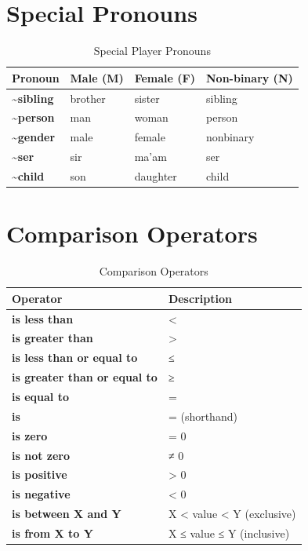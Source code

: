 \documentclass[11pt,letterpaper,oldstylefigures]{memoir}
\newcommand{\fountain}[1]{\textbf{#1}}
\begin{document}
\section{Special Pronouns}
\begin{table}[h]
\centering
\renewcommand{\arraystretch}{1.3}
\setlength{\tabcolsep}{12pt}
\begin{tabular}{|l|l|l|l|}
\hline
\textbf{Pronoun} & \textbf{Male (M)} & \textbf{Female (F)} & \textbf{Non-binary (N)} \\
\hline\hline
\fountain{\textasciitilde{}sibling} & brother & sister & sibling \\
\fountain{\textasciitilde{}person} & man & woman & person \\
\fountain{\textasciitilde{}gender} & male & female & nonbinary \\
\fountain{\textasciitilde{}ser} & sir & ma'am & ser \\
\fountain{\textasciitilde{}child} & son & daughter & child \\
\hline
\end{tabular}
\caption{Special Player Pronouns}
\end{table}

\section{Comparison Operators}
\begin{table}[h]
\centering
\begin{tabular}{|l|l|}
\hline
\textbf{Operator} & \textbf{Description} \\
\hline
\fountain{is less than} & < \\
\fountain{is greater than} & > \\
\fountain{is less than or equal to} & ≤ \\
\fountain{is greater than or equal to} & ≥ \\
\fountain{is equal to} & = \\
\fountain{is} & = (shorthand) \\
\fountain{is zero} & = 0 \\
\fountain{is not zero} & ≠ 0 \\
\fountain{is positive} & > 0 \\
\fountain{is negative} & < 0 \\
\fountain{is between X and Y} & X < value < Y (exclusive) \\
\fountain{is from X to Y} & X ≤ value ≤ Y (inclusive) \\
\hline
\end{tabular}
\caption{Comparison Operators}
\end{table}
\end{document}
